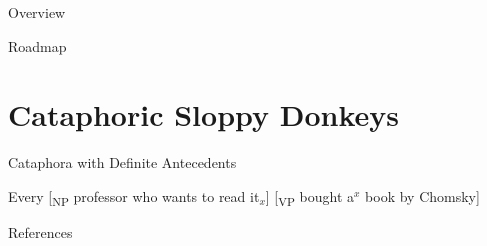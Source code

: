 \documentclass{beamer}
\begin{document}

\begin{frame}{Overview}
  

\end{frame}

\begin{frame}{Roadmap}


\end{frame}

\section{Cataphoric Sloppy Donkeys}

\begin{frame}{Cataphora with Definite Antecedents}

  Every [\textsubscript{NP} professor who wants to read it$_x$] [\textsubscript{VP} bought a$^x$ book by Chomsky]

\end{frame}



\begin{frame}[allowframebreaks]{References}

  \printbibliography[heading=none]

\end{frame}
\end{document}
